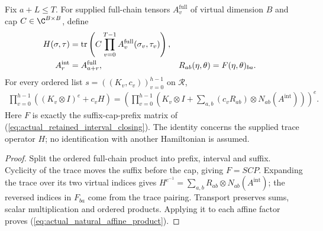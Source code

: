 \begin{lemma}
    \label{thm:actual_natural_affine_product}
    \leanok
    Fix $a+L\le T$. For supplied full-chain tensors $A^{\mathrm{full}}_v$
    of virtual dimension $B$ and cap $C\in\C^{B\times B}$, define
    \begin{align}
        H(\sigma,\tau)      & =\operatorname{tr}\left(
        C\prod_{v=0}^{T-1}A^{\mathrm{full}}_v(\sigma_v,\tau_v)\right),\notag \\
        A^{\mathrm{int}}_r  & =A^{\mathrm{full}}_{a+r}, &
        R_{ab}(\eta,\theta) & =F(\eta,\theta)_{ba}.
        \label{eq:actual_natural_affine_data}
    \end{align}
    For every ordered list $s=((K_v,c_v))_{v=0}^{h-1}$ on $\mathcal R$,
    \begin{align}
        \prod_{v=0}^{h-1}\left((K_v\otimes I)^e+c_vH\right)
        =\left(\prod_{v=0}^{h-1}\left(K_v\otimes I+
        \sum_{a,b}(c_vR_{ab})\otimes N_{ab}(A^{\mathrm{int}})\right)\right)^e.
        \label{eq:actual_natural_affine_product}
    \end{align}
    Here $F$ is exactly the suffix-cap-prefix matrix of
    (\ref{eq:actual_retained_interval_closing}). The identity concerns the
    supplied trace operator $H$; no identification with another Hamiltonian
    is assumed.
\end{lemma}
\begin{proof}\leanok
    Split the ordered full-chain product into prefix, interval and suffix.
    Cyclicity of the trace moves the suffix before the cap, giving $F=SCP$.
    Expanding the trace over its two virtual indices gives
    $H^{{e}^{-1}}=\sum_{a,b}R_{ab}\otimes N_{ab}(A^{\mathrm{int}})$;
    the reversed indices in $F_{ba}$ come from the trace pairing.
    Transport preserves sums, scalar multiplication and ordered products.
    Applying it to each affine factor proves
    (\ref{eq:actual_natural_affine_product}).
\end{proof}
